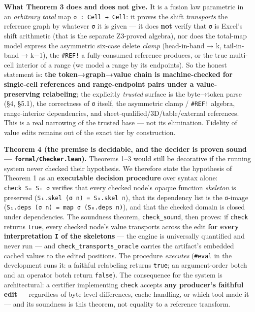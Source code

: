 \documentclass[
  11pt,
]{article}
\begin{document}
\textbf{What Theorem 3 does and does not give.} It is a fusion law
parametric in an \emph{arbitrary total} map
\texttt{σ\ :\ Cell\ →\ Cell}: it proves the shift \emph{transports} the
reference graph by whatever \texttt{σ} it is given --- it does
\textbf{not} verify that \texttt{σ} is Excel's shift arithmetic (that is
the separate Z3-proved algebra), nor does the total-map model express
the asymmetric six-case delete \emph{clamp} (head-in-band → k,
tail-in-band → k−1), the \texttt{\#REF!} a fully-consumed reference
produces, or the true multi-cell interior of a range (we model a range
by its endpoints). So the honest statement is: \textbf{the
token→graph→value chain is machine-checked for single-cell references
and range-endpoint pairs under a value-preserving relabeling}; the
explicitly \emph{trusted} surface is the byte→token parse (§4, §5.1),
the correctness of \texttt{σ} itself, the asymmetric clamp /
\texttt{\#REF!} algebra, range-interior dependencies, and
sheet-qualified/3D/table/external references. This is a real narrowing
of the trusted base --- not its elimination. Fidelity of value edits
remains out of the exact tier by construction.

\textbf{Theorem 4 (the premise is decidable, and the decider is proven
sound --- \texttt{formal/Checker.lean}).} Theorems 1--3 would still be
decorative if the running system never checked their hypothesis. We
therefore state the hypothesis of Theorem 1 as an \textbf{executable
decision procedure} over syntax alone: \texttt{check\ S₀\ S₁\ σ}
verifies that every checked node's opaque function \emph{skeleton} is
preserved (\texttt{S₁.skel\ (σ\ n)\ =\ S₀.skel\ n}), that its dependency
list is the \texttt{σ}-image
(\texttt{S₁.deps\ (σ\ n)\ =\ map\ σ\ (S₀.deps\ n)}), and that the
checked domain is closed under dependencies. The soundness theorem,
\texttt{check\_sound}, then proves: if \texttt{check} returns
\texttt{true}, every checked node's value transports across the edit
\textbf{for every interpretation \texttt{I} of the skeletons} --- the
engine is universally quantified and never run --- and
\texttt{check\_transports\_oracle} carries the artifact's embedded
cached values to the edited positions. The procedure \emph{executes}
(\texttt{\#eval} in the development runs it: a faithful relabeling
returns \texttt{true}; an argument-order botch and an operator botch
return \texttt{false}). The consequence for the system is architectural:
a certifier implementing \texttt{check} accepts \textbf{any producer's
faithful edit} --- regardless of byte-level differences, cache handling,
or which tool made it --- and its soundness is this theorem, not
equality to a reference transform.
\end{document}
